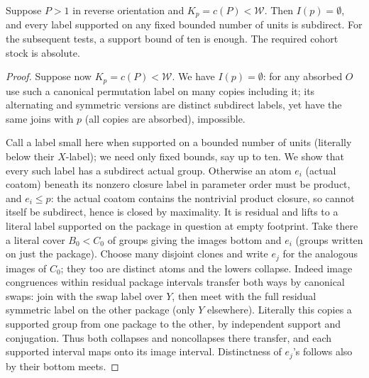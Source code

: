 \begin{lemma}\label{t:weighted-small-labels}
Suppose \(P>1\) in reverse orientation and
\(K_p=c(P)<\mathcal W\).  Then \(I(p)=\emptyset\), and every label supported
on any fixed bounded number of units is subdirect.  For the subsequent tests,
a support bound of ten is enough.  The required cohort stock is absolute.
\end{lemma}
\begin{proof}
Suppose now \(K_p=c(P)<\mathcal W\). We have \(I(p)=\emptyset\): for any absorbed \(O\) use such a
canonical permutation label on many copies including it; its alternating and symmetric versions
are distinct subdirect labels, yet have the same joins with \(p\) (all copies are absorbed),
impossible.

Call a label small here when supported on a bounded number of units (literally below their
\(X\)-label); we need only fixed bounds, say up to ten. We show that every such label has a
subdirect actual group. Otherwise an atom \(e_i\) (actual coatom) beneath its nonzero closure
label in parameter order must be product, and \(e_i\le p\): the actual coatom contains the
nontrivial product closure, so cannot itself be subdirect, hence is closed by maximality. It is
residual and lifts to a literal label supported on the package in question at empty footprint.
Take there a literal cover \(B_0<C_0\) of groups giving the images bottom and \(e_i\) (groups
written on just the package). Choose many disjoint clones and write \(e_j\) for the analogous
images of \(C_0\); they too are distinct atoms and the lowers collapse. Indeed image congruences
within residual package intervals transfer both ways by canonical swaps: join with the swap label
over \(Y\), then meet with the full residual symmetric label on the other package (only \(Y\)
elsewhere). Literally this copies a supported group from one package to the other, by independent
support and conjugation. Thus both collapses and noncollapses there transfer, and each supported
interval maps onto its image interval. Distinctness of \(e_j\)'s follows also by their bottom
meets.


\end{proof}
